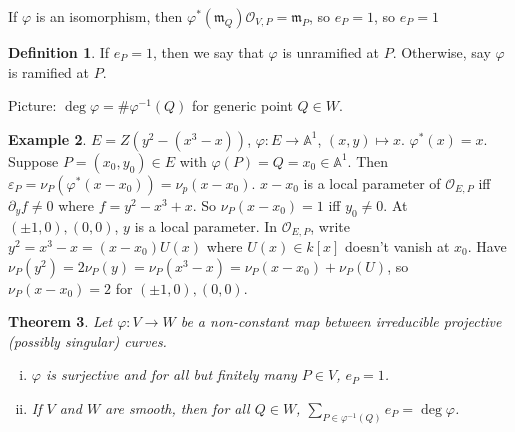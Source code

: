 \documentclass{article}
\theoremstyle{definition}
\newtheorem{defn}{Definition}[section]
\newtheorem{example}[defn]{Example}
\theoremstyle{remark}
\theoremstyle{plain}
\newtheorem{thm}[defn]{Theorem}
\newcommand{\bA}{\mathbb{A}}
\newcommand{\e}{\varepsilon}
\begin{document}
 If $\varphi$ is an isomorphism, then $\varphi^\ast(\mathfrak m_Q)\mathcal O_{V,P}=\mathfrak m_P$, so $e_P=1$, so $e_P=1$
\begin{defn}
   If $e_P=1$, then we say that $\varphi$ is unramified at $P$. Otherwise, say $\varphi$ is ramified at $P$.
\end{defn}
Picture: $\deg\varphi=\#\varphi^{-1}(Q)$ for generic point $Q\in W$.
\begin{example}
    $E=Z(y^2-(x^3-x))$, $\varphi:E\to\bA^1$, $(x,y)\mapsto x$. $\varphi^\ast(x)=x$. Suppose $P=(x_0,y_0)\in E$ with $\varphi(P)=Q=x_0\in\bA^1$. Then $\e_P=\nu_P(\varphi^\ast(x-x_0))=\nu_p(x-x_0)$. $x-x_0$ is a local parameter of $\mathcal O_{E,P}$ iff $\partial_yf\neq 0$ where $f=y^2-x^3+x$. So $\nu_P(x-x_0)=1$ iff $y_0\neq 0$. At $(\pm 1,0), (0,0)$, $y$ is a local parameter. In $\mathcal O_{E,P}$, write $y^2=x^3-x=(x-x_0)U(x)$ where $U(x)\in k[x]$ doesn't vanish at $x_0$. Have
    $\nu_P(y^2)=2\nu_P(y)=\nu_P(x^3-x)=\nu_P(x-x_0)+\nu_P(U)$, so $\nu_P(x-x_0)=2$ for $(\pm 1,0), (0,0)$.
\end{example}
\begin{thm}
    Let $\varphi:V\to W$ be a non-constant map between irreducible projective (possibly singular) curves. \begin{enumerate}[(i)]
        \item $\varphi$ is surjective and for all but finitely many $P\in V$, $e_P=1$.
        \item If $V$ and $W$ are smooth, then for all $Q\in W$, $\sum_{P\in \varphi^{-1}(Q)}e_P=\deg\varphi$.
    \end{enumerate}
\end{thm}
\end{document}
